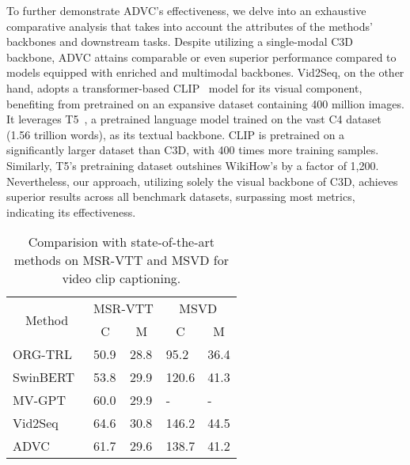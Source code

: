 To further demonstrate ADVC's effectiveness, we delve into an exhaustive comparative analysis that takes into account the attributes of the methods' backbones and downstream tasks.
Despite utilizing a single-modal C3D~\cite{Tran2015-uq} backbone, ADVC attains comparable or even superior performance compared to models equipped with enriched and multimodal backbones.
Vid2Seq, on the other hand, adopts a transformer-based CLIP~\cite{Radford2021-kx} model for its visual component, benefiting from pretrained on an expansive dataset containing 400 million images.
It leverages T5~\cite{Raffel2020-fv}, a pretrained language model trained on the vast C4 dataset (1.56 trillion words), as its textual backbone.
CLIP is pretrained on a significantly larger dataset than C3D, with 400 times more training samples. 
Similarly, T5's pretraining dataset outshines WikiHow's by a factor of 1,200.
Nevertheless, our approach, utilizing solely the visual backbone of C3D, achieves superior results across all benchmark datasets, surpassing most metrics, indicating its effectiveness.

\begin{table}[t]
    \centering
    \caption{Comparision with state-of-the-art methods on MSR-VTT and MSVD for video clip captioning.}
    \begin{tabular}{l|ll|ll}
    \hline
    \multicolumn{1}{c|}{\multirow{2}{*}{Method}} & \multicolumn{2}{c|}{MSR-VTT}                   & \multicolumn{2}{c}{MSVD}                      \\
    \multicolumn{1}{c|}{}                        & \multicolumn{1}{c}{C} & \multicolumn{1}{c|}{M} & \multicolumn{1}{c}{C} & \multicolumn{1}{c}{M} \\ \hline
    ORG-TRL~\cite{Zhang2020-rl}                                       & 50.9                  & 28.8                   & 95.2                         & 36.4                     \\
    SwinBERT~\cite{Lin2022-wi}                                       & 53.8                  & 29.9                   & 120.6                     & 41.3                     \\
    MV-GPT~\cite{Seo2022-ok}                                       & 60.0                  & 29.9                   & -                     & -                     \\
    Vid2Seq~\cite{Yang2023-fm}                                      & 64.6                  & 30.8                   & 146.2                 & 44.5                  \\
    ADVC                                         & 61.7                      & 29.6                       & 138.7                      & 41.2                      \\ \hline
    \end{tabular}
    \label{tab:performance_video_clip}
\end{table}

